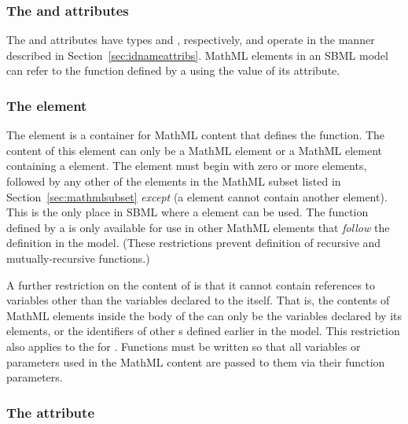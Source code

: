 \subsubsection{The  and  attributes}

The  and  attributes have types 
and , respectively, and operate in the manner
described in Section~\ref{sec:idnameattribs}.  MathML 
elements in an SBML model can refer to the function defined by a
\FunctionDefinition using the value of its  attribute.


\subsubsection{The  element}
\label{sec:function-definition-math}

The  element is a container for MathML
content that defines the function.  The content of this
element can only be a MathML  element
or a MathML  element containing a
   element.  The  element must begin
with zero or more  elements, followed by any other of
the elements in the MathML subset listed in
Section~\ref{sec:mathmlsubset} \emph{except}  (\ie a
 element cannot contain another 
element).  This is the only place in SBML where a 
element can be used.  The function defined by a
\FunctionDefinition is only available for use in other MathML
elements that \emph{follow} the \FunctionDefinition definition in
the model.  (These restrictions prevent definition of
  recursive and mutually-recursive functions.)

A further restriction on the content of  is that it
cannot contain references to variables other than the variables
declared to the  itself.  That is, the contents of
MathML  elements inside the body of the 
can only be the variables declared by its  elements,
or the identifiers of other \FunctionDefinition{}s defined earlier
in the model.  This restriction also applies to the
   for .  Functions must be written
so that all variables or parameters used in the MathML content are
passed to them via their function parameters.


\subsubsection{The  attribute}
\label{sec:functiondefinition-sboterm}

